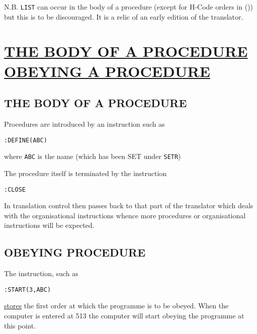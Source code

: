 \documentclass[10pt, a4paper, oneside]{article}
\newcommand{\myuline}[1]{\uline{#1}}
\newcommand{\mytt}[1]{\texttt{\scriptsize #1}}
\newcommand{\mytt}[1]{\texttt{\small #1}}
\begin{document}
\begin{multicols}{2}
N.B. \mytt{LIST} can occur in the body of a procedure
(except for H-Code orders in ()) but this is to be
discouraged.  It is a relic of an early edition of the
translator.


\section{\myuline{THE BODY OF A PROCEDURE} \myuline{OBEYING A PROCEDURE}}

\subsection{THE BODY OF A PROCEDURE}

Procedures are introduced by an instruction such
as

\begin{addmargin}[1cm]{1em}%
\begin{lstlisting}
:DEFINE(ABC)
\end{lstlisting}
\end{addmargin}

\begin{flushleft}
where \mytt{ABC} is the name (which has been SET under \mytt{SETR})
\end{flushleft}

The procedure itself is terminated by the
instruction

\begin{addmargin}[1cm]{1em}%
\begin{lstlisting}
:CLOSE
\end{lstlisting}
\end{addmargin}

In translation control then passes back to that
part of the translator which deals with the
organisational instructions whence more procedures or
organisational instructions will be expected.

\subsection{OBEYING PROCEDURE}

The instruction, such as

\begin{addmargin}[1cm]{1em}%
\begin{lstlisting}
:START(3,ABC)
\end{lstlisting}
\end{addmargin}

\begin{flushleft}
\myuline{stores} the first order at which the programme is to be
obeyed.  When the computer is entered at 513 the
computer will start obeying the programme at this
point.
\end{flushleft}


\end{multicols}
\end{document}
